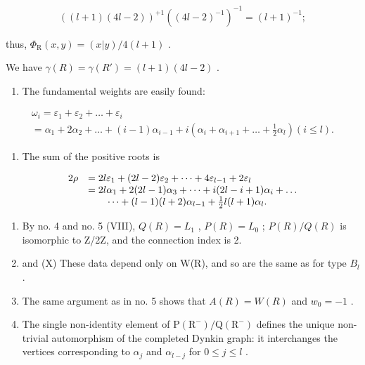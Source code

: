 \[
((l + 1) (4 l - 2)) ^ {+ 1} ((4 l - 2) ^ {- 1}) ^ {- 1} = (l + 1) ^ {- 1};
\]

thus, \(\Phi_{\mathrm{R}}(x,y) = (x|y) / 4(l + 1)\) .

We have \(\gamma(R) = \gamma(R') = (l + 1)(4l - 2)\) .

\begin{enumerate}
\def\labelenumi{(\Roman{enumi})}
\setcounter{enumi}{5}
\tightlist
\item
  The fundamental weights are easily found:
\end{enumerate}

\[
\begin{array}{l} \omega_ {i} = \varepsilon_ {1} + \varepsilon_ {2} + \dots + \varepsilon_ {i} \\ = \alpha_ {1} + 2 \alpha_ {2} + \dots + (i - 1) \alpha_ {i - 1} + i (\alpha_ {i} + \alpha_ {i + 1} + \dots + \frac {1}{2} \alpha_ {l}) (i \leqslant l). \end{array}
\]

\begin{enumerate}
\def\labelenumi{(\Roman{enumi})}
\setcounter{enumi}{6}
\tightlist
\item
  The sum of the positive roots is
\end{enumerate}

\[
\begin{array}{r l} 2 \rho & = 2 l \varepsilon_ {1} + (2 l - 2) \varepsilon_ {2} + \dots + 4 \varepsilon_ {l - 1} + 2 \varepsilon_ {l} \\ & = 2 l \alpha_ {1} + 2 (2 l - 1) \alpha_ {3} + \dots + i (2 l - i + 1) \alpha_ {i} + \dots \\ & \qquad \dots + (l - 1) (l + 2) \alpha_ {l - 1} + \frac {1}{2} l (l + 1) \alpha_ {l}. \end{array}
\]

\begin{enumerate}
\def\labelenumi{(\Roman{enumi})}
\setcounter{enumi}{7}
\item
  By no. 4 and no. 5 (VIII), \(Q(R) = L_{1}\) , \(P(R) = L_{0}\) ; \(P(R)/Q(R)\) is isomorphic to Z/2Z, and the connection index is 2.
\item
  and (X) These data depend only on W(R), and so are the same as for type \(B_{l}\) .
\item
  The same argument as in no. 5 shows that \(A(R) = W(R)\) and \(w_0 = -1\) .
\item
  The single non-identity element of \(\mathrm{P}(\mathrm{R}^{-})/\mathrm{Q}(\mathrm{R}^{-})\) defines the unique non-trivial automorphism of the completed Dynkin graph: it interchanges the vertices corresponding to \(\alpha_{j}\) and \(\alpha_{l-j}\) for \(0 \leqslant j \leqslant l\) .
\end{enumerate}

